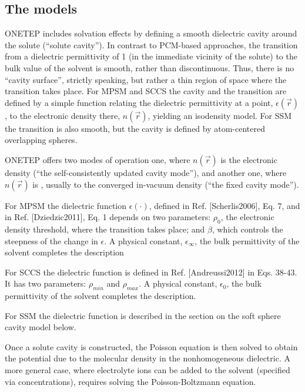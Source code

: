 \documentclass[letterpaper,10pt,english]{sphinxmanual}
\begin{document}
\subsection{The models}
\label{\detokenize{implicit_solvation_v3:the-models}}
ONETEP includes solvation effects by defining a smooth dielectric cavity
around the solute (“solute cavity”). In contrast to PCM-based
approaches, the transition from a dielectric permittivity of 1 (in the
immediate vicinity of the solute) to the bulk value of the solvent is
smooth, rather than discontinuous. Thus, there is no “cavity surface”,
strictly speaking, but rather a thin region of space where the
transition takes place. For MPSM and SCCS the cavity and the transition
are defined by a simple function relating the dielectric permittivity at
a point, \(\epsilon(\vec{r})\), to the electronic density there,
\(n(\vec{r})\), yielding an isodensity model. For SSM the transition
is also smooth, but the cavity is defined by atom-centered overlapping
spheres.

ONETEP offers two modes of operation \textendash{} one, where \(n(\vec{r})\) is
the  electronic density (“the self-consistently updated cavity
mode”), and another one, where \(n(\vec{r})\) is , usually to
the converged in-vacuum density (“the fixed cavity mode”).

For MPSM the dielectric function \(\epsilon(\cdot)\), defined in
Ref. {[}Scherlis2006{]}, Eq. 7, and in Ref. {[}Dziedzic2011{]}, Eq. 1 depends on two parameters:
\(\rho_{0}\), the electronic density threshold, where the transition
takes place; and \(\beta\), which controls the steepness of the
change in \(\epsilon\). A physical constant,
\(\epsilon_{\infty}\), the bulk permittivity of the solvent
completes the description

For SCCS the dielectric function is defined in Ref. {[}Andreussi2012{]} in Eqs. 38-43. It
has two parameters: \(\rho_{\textit{min}}\) and
\(\rho_{\textit{max}}\). A physical constant, \(\epsilon_0\),
the bulk permittivity of the solvent completes the description.

For SSM the dielectric function is described in the section on the soft sphere cavity model below.

Once a solute cavity is constructed, the Poisson equation is then solved
to obtain the potential due to the molecular density in the
nonhomogeneous dielectric. A more general case, where electrolyte ions
can be added to the solvent (specified via concentrations), requires
solving the Poisson-Boltzmann equation.
\end{document}
